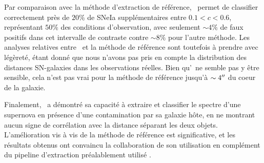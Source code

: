 \documentclass[../main/main.tex]{subfiles}
\begin{document}
Par comparaison avec la méthode d'extraction de référence,
\hypergal\ permet de classifier correctement près de $20\%$ de SNeIa
supplémentaires entre $0.1<c<0.6$, représentant $50\%$ des conditions
d'observation, avec seulement $\sim4\%$ de faux positifs dans cet
intervalle de contraste contre
$\sim8\%$ pour l'autre méthode.
Les
analyses relatives entre \hypergal\ et la méthode de référence sont
toutefois à prendre avec légèreté, étant donné que nous n'avons pas pris
en compte la distribution des distances SN-galaxies dans les observations
réelles. Bien qu'\hypergal\ ne semble pas y être sensible, cela n'est
pas vrai pour la méthode de référence jusqu'à $\sim4^{\prime\prime}$ du coeur de
la galaxie.

Finalement, \hypergal\ a démontré sa capacité à extraire et
classifier le spectre d'une
supernova en présence d'une contamination par sa galaxie hôte, en ne
montrant aucun signe de corrélation avec la distance séparant les deux
objets. L'amélioration vis à vis de la méthode de référence est
significative, et les résultats obtenus ont convaincu la collaboration
de son utilisation en complément du pipeline d'extraction préalablement utilisé \pysedm.

%
%
\end{document}
